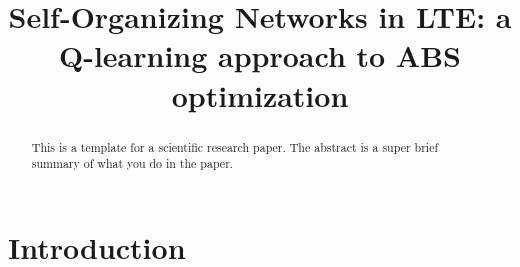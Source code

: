 \documentclass[conference,10pt]{IEEEtran}
\begin{document}
\title{Self-Organizing Networks	in LTE: a Q-learning approach to ABS optimization}

\author{
}

\maketitle

\begin{abstract}
This is a template for a scientific research paper. The abstract is a super brief summary of what you do in the paper.
\end{abstract}

\section{Introduction}\label{sec:intro}
\end{document}
